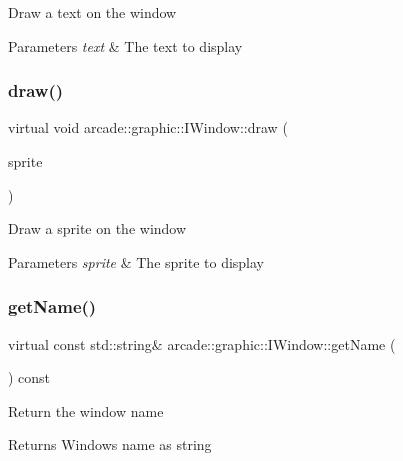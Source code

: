 Draw a text on the window 
\begin{DoxyParams}{Parameters}
{\em text} & The text to display \\
\hline
\end{DoxyParams}
\mbox{\label{classarcade_1_1graphic_1_1_i_window_a13085d82338bc91f9ac24b6430e373e4}} 
\subsubsection{\texorpdfstring{draw()}{draw()}\hspace{0.1cm}{\footnotesize\ttfamily [2/2]}}
{\footnotesize\ttfamily virtual void arcade\+::graphic\+::\+I\+Window\+::draw (\begin{DoxyParamCaption}\item[{const \mbox{\hyperlink{classarcade_1_1graphic_1_1_i_sprite}{I\+Sprite}} \&}]{sprite }\end{DoxyParamCaption})\hspace{0.3cm}{\ttfamily [pure virtual]}}

Draw a sprite on the window 
\begin{DoxyParams}{Parameters}
{\em sprite} & The sprite to display \\
\hline
\end{DoxyParams}
\mbox{\label{classarcade_1_1graphic_1_1_i_window_aaf984acf6c057878bc1c24134b897459}} 
\subsubsection{\texorpdfstring{getName()}{getName()}}
{\footnotesize\ttfamily virtual const std\+::string\& arcade\+::graphic\+::\+I\+Window\+::get\+Name (\begin{DoxyParamCaption}{ }\end{DoxyParamCaption}) const\hspace{0.3cm}{\ttfamily [pure virtual]}}

Return the window name \begin{DoxyReturn}{Returns}
Window\textquotesingle{}s name as string 
\end{DoxyReturn}
\mbox{\label{classarcade_1_1graphic_1_1_i_window_afe84df5e5cc47ba9d9e277d62f292684}} 
